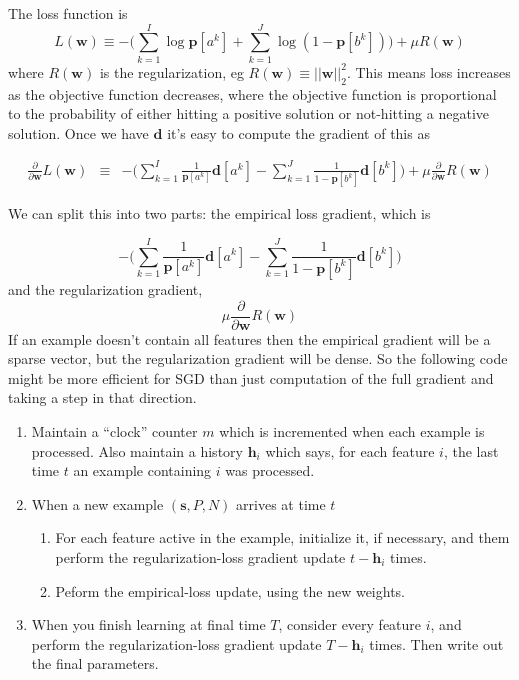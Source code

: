 \documentclass[12pt]{article}
\newcommand{\vek}[1]{\textbf{#1}}
\newcommand{\ddw}{\frac{\partial}{\partial\vek{w}}}
\begin{document}
The loss function is
\begin{equation}
L(\vek{w}) \equiv - \Bigg (\sum_{k=1}^I \log \vek{p}[a^k] + \sum_{k=1}^J \log (1 - \vek{p}[b^k]) \Bigg) + \mu R(\vek{w})
\end{equation}
where $R(\vek{w})$ is the regularization, eg
$R(\vek{w})\equiv||\vek{w}||^2_2$. This means loss increases as the objective function decreases, where the objective function is proportional to the probability of either hitting a positive solution or not-hitting a negative solution.  Once we have $\vek{d}$ it's easy
to compute the gradient of this as

\begin{eqnarray}
\ddw L(\vek{w}) & \equiv & - \Bigg (\sum_{k=1}^I \frac{1}{\vek{p}[a^k]}\vek{d}[a^k] 
                                  - \sum_{k=1}^J \frac{1}{1 - \vek{p}[b^k]}\vek{d}[b^k] \Bigg) + \mu \ddw R(\vek{w})
\end{eqnarray}

We can split this into two parts: the empirical loss gradient, which is

\[
-\Bigg (\sum_{k=1}^I \frac{1}{\vek{p}[a^k]}\vek{d}[a^k] 
     - \sum_{k=1}^J \frac{1}{1 - \vek{p}[b^k]}\vek{d}[b^k] \Bigg)
\]
and the regularization gradient, 
\[
 \mu \ddw R(\vek{w})
\]
If an example doesn't contain all features then the empirical gradient
will be a sparse vector, but the regularization gradient will be
dense.  So the following code might be more efficient for SGD than
just computation of the full gradient and taking a step in that
direction.

\begin{enumerate}
\item Maintain a ``clock'' counter $m$ which is incremented when each
  example is processed. Also maintain a history $\vek{h}_i$ which
  says, for each feature $i$, the last time $t$ an example containing
  $i$ was processed.
\item When a new example $(\vek{s},P,N)$ arrives at time $t$
  \begin{enumerate}
    \item For each feature active in the example, initialize it, if
      necessary, and them perform the regularization-loss gradient
      update $t-\vek{h}_i$ times.
    \item Peform the empirical-loss update, using 
      the new weights.
  \end{enumerate}
\item When you finish learning at final time $T$, consider every
  feature $i$, and perform the regularization-loss gradient update
  $T-\vek{h}_i$ times.  Then write out the final parameters.
\end{enumerate}
\end{document}

